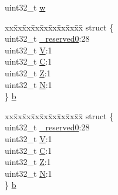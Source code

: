 \begin{DoxyCompactItemize}
\begin{tabbing}
\end{tabbing}\item 
uint32\+\_\+t \hyperlink{union_a_p_s_r___type_ae4c2ef8c9430d7b7bef5cbfbbaed3a94}{w}
\item 
\begin{tabbing}
xx\=xx\=xx\=xx\=xx\=xx\=xx\=xx\=xx\=\kill
struct \{\\
\>uint32\_t \hyperlink{union_a_p_s_r___type_afbce95646fd514c10aa85ec0a33db728}{\_reserved0}:28\\
\>uint32\_t \hyperlink{union_a_p_s_r___type_a8004d224aacb78ca37774c35f9156e7e}{V}:1\\
\>uint32\_t \hyperlink{union_a_p_s_r___type_a86e2c5b891ecef1ab55b1edac0da79a6}{C}:1\\
\>uint32\_t \hyperlink{union_a_p_s_r___type_a3b04d58738b66a28ff13f23d8b0ba7e5}{Z}:1\\
\>uint32\_t \hyperlink{union_a_p_s_r___type_a7e7bbba9b00b0bb3283dc07f1abe37e0}{N}:1\\
\} \hyperlink{union_a_p_s_r___type_aaf8972e1f4a81818ee4ad5acc6ddb1f0}{b}\\

\end{tabbing}\item 
\begin{tabbing}
xx\=xx\=xx\=xx\=xx\=xx\=xx\=xx\=xx\=\kill
struct \{\\
\>uint32\_t \hyperlink{union_a_p_s_r___type_afbce95646fd514c10aa85ec0a33db728}{\_reserved0}:28\\
\>uint32\_t \hyperlink{union_a_p_s_r___type_a8004d224aacb78ca37774c35f9156e7e}{V}:1\\
\>uint32\_t \hyperlink{union_a_p_s_r___type_a86e2c5b891ecef1ab55b1edac0da79a6}{C}:1\\
\>uint32\_t \hyperlink{union_a_p_s_r___type_a3b04d58738b66a28ff13f23d8b0ba7e5}{Z}:1\\
\>uint32\_t \hyperlink{union_a_p_s_r___type_a7e7bbba9b00b0bb3283dc07f1abe37e0}{N}:1\\
\} \hyperlink{union_a_p_s_r___type_a250681ece58cf12233f316edea344e75}{b}\\


\end{tabbing}
\end{DoxyCompactItemize}
